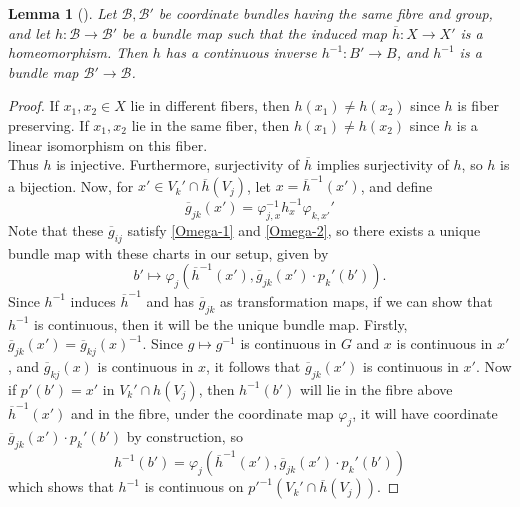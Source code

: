 \documentclass[reqno]{amsart}
\newtheorem{lemma}[theorem]{Lemma}
\theoremstyle{definition}
\theoremstyle{remark}
\begin{document}
\begin{lemma}[]
    Let $\mathcal{B}, \mathcal{B}'$ be coordinate bundles having
    the same fibre and group, and let $h \colon \mathcal{B}
    \to \mathcal{B}'$ be a bundle map such that
    the induced map $\overline{h} \colon X \to X'$ is
    a homeomorphism. Then
    $h$ has a continuous inverse
    $h^{-1} \colon B' \to B$, and
    $h^{-1}$ is a bundle map
    $\mathcal{B}' \to \mathcal{B}$.
\end{lemma}

\begin{proof}
    If $x_1,x_2 \in X$ lie in different fibers, then
    $h(x_1) \neq h(x_2)$ since $h$ is fiber preserving.
    If $x_1,x_2$ lie in the same fiber, then 
    $h(x_1) \neq h(x_2)$ since $h$ is a linear isomorphism
    on this fiber.\\
    Thus $h$ is injective. Furthermore,
    surjectivity of $\overline{h}$ implies surjectivity
    of $h$, so $h$ is a bijection.
    Now, for $x' \in V_k' \cap
    \overline{h}(V_j)$, let
    $x = \overline{h}^{-1}(x')$, and define
    \[
    \overline{g}_{jk}(x') = 
    \varphi_{j,x}^{-1} h_x^{-1} \varphi_{k,x'}'
    \] 
    Note that these $\overline{g}_{ij}$ satisfy
    \eqref{Omega-1} and \eqref{Omega-2}, so
    there exists a unique bundle map with these
    charts in our setup, given by
    \[
    b' \mapsto 
    \varphi_j \left( \overline{h}^{-1}(x'),
    \overline{g}_{jk}(x') \cdot p_k'(b') \right) .
    \] 
    Since $h^{-1}$ induces $\overline{h}^{-1}$ and
    has $\overline{g}_{jk}$ as transformation
    maps, if we can show that $h^{-1}$ is continuous, then
    it will be the unique bundle map.
    Firstly,
    $\overline{g}_{jk}(x') = 
    \overline{g}_{kj}(x)^{-1}$. Since
    $g\mapsto g^{-1}$ is continuous in $G$ and
    $x$ is continuous in $x'$, and
    $\overline{g}_{kj}(x)$ is continuous in $x$, it follows
     that $\overline{g}_{jk}(x')$ is continuous in $x'$.
     Now if $p'(b') = x'$ in 
     $V_{k}' \cap h(V_j)$, then
     $h^{-1}(b')$ will lie in the fibre above
     $\overline{h}^{-1}(x')$ and in the fibre, under the
     coordinate map $\varphi_j$, it will
     have coordinate 
     $\overline{g}_{jk}(x') \cdot p_k'(b')$ by
     construction, so
     \[
     h^{-1}(b') = 
     \varphi_j \left( \overline{h}^{-1}(x'),
     \overline{g}_{jk}(x') \cdot 
 p_k' (b') \right) 
     \] 
     which shows that $h^{-1}$ is continuous on
     $p'^{-1}\left( V_k' \cap \overline{h}(V_j) \right) $.
    
\end{proof}
\end{document}
